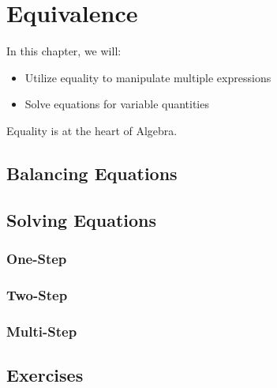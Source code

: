 

\chapter{Equivalence}

\begin{summary}
In this chapter, we will:
\begin{itemize}
    \item Utilize equality to manipulate multiple expressions
    \item Solve equations for variable quantities 
\end{itemize}

Equality is at the heart of Algebra. 
\end{summary}



\newpage 
\section{Balancing Equations}



\newpage 
\section{Solving Equations}

\subsection{One-Step}
\subsection{Two-Step}
\subsection{Multi-Step}


\newpage 
\section{Exercises} 